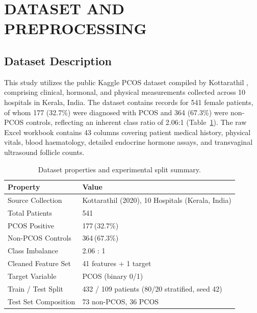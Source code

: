 \documentclass[10pt,twocolumn,a4paper]{article}
\begin{document}
\section{DATASET AND PREPROCESSING}

\subsection{Dataset Description}
This study utilizes the public Kaggle PCOS dataset compiled by Kottarathil \cite{kottarathil2020pcos}, comprising
clinical, hormonal, and physical measurements collected across 10 hospitals in Kerala, India.
The dataset contains records for 541 female patients, of whom 177 (32.7\%) were diagnosed with PCOS and 364 (67.3\%)
were non-PCOS controls, reflecting an inherent class ratio of 2.06:1 (Table~\ref{tab:dataset}).
The raw Excel workbook contains 43 columns covering patient medical history, physical vitals, blood haematology,
detailed endocrine hormone assays, and transvaginal ultrasound follicle counts.

\begin{table}[t]
\centering
\caption{Dataset properties and experimental split summary.}
\label{tab:dataset}
\small
\begin{tabularx}{\columnwidth}{@{}lX@{}}
\toprule
Property & Value \\
\midrule
Source Collection & Kottarathil (2020), 10 Hospitals (Kerala, India) \\
Total Patients & 541 \\
PCOS Positive & 177\,(32.7\%) \\
Non-PCOS Controls & 364\,(67.3\%) \\
Class Imbalance & 2.06 : 1 \\
Cleaned Feature Set & 41 features + 1 target \\
Target Variable & PCOS (binary 0/1) \\
Train / Test Split & 432 / 109 patients (80/20 stratified, seed 42) \\
Test Set Composition & 73 non-PCOS, 36 PCOS \\
\bottomrule
\end{tabularx}
\end{table}
\end{document}
